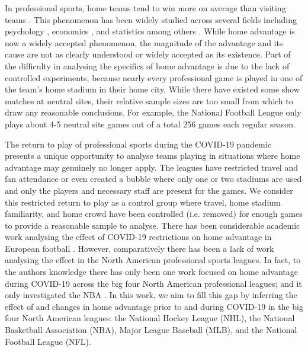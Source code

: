 In professional sports, home teams tend to win more on average than visiting teams \cite{Schwartz1977} \cite{Courneya1992} \cite{Nevill1999}. This phenomenon has been widely studied across several fields including psychology \cite{Agnew1994} \cite{Unkelbach2010}, economics \cite{Forrest2005} \cite{Dohmen2016}, and statistics \cite{Buraimo2010} \cite{Lopez2018} among others \cite{Benz2020}. While home advantage is now a widely accepted phenomenon, the magnitude of the advantage and its cause are not as clearly understood or widely accepted as its existence. Part of the difficulty in analysing the specifics of home advantage is due to the lack of controlled experiments, because nearly every professional game is played in one of the team's home stadium in their home city. While there have existed some show matches at neutral sites, their relative sample sizes are too small from which to draw any reasonable conclusions. For example, the National Football League only plays about 4-5 neutral site games out of a total 256 games each regular season.

The return to play of professional sports during the COVID-19 pandemic presents a unique opportunity to analyse teams playing in situations where home advantage may genuinely no longer apply. The leagues have restricted travel and fan attendance or even created a bubble where only one or two stadiums are used and only the players and necessary staff are present for the games. We consider this restricted return to play as a control group where travel, home stadium familiarity, and home crowd have been controlled (i.e. removed) for enough games to provide a reasonable sample to analyse. There has been considerable academic work analysing the effect of COVID-19 restrictions on home advantage in European football \cite{Benz2020}. However, comparatively there has been a lack of work analysing the effect in the North American professional sports leagues. In fact, to the authors knowledge there has only been one work focused on home advantage during COVID-19 across the big four North American professional leagues; and it only investigated the NBA \cite{McHill2020}. In this work, we aim to fill this gap by inferring the effect of and changes in home advantage prior to and during COVID-19 in the big four North American leagues: the National Hockey League (NHL), the National Basketball Association (NBA), Major League Baseball (MLB), and the National Football League (NFL).

